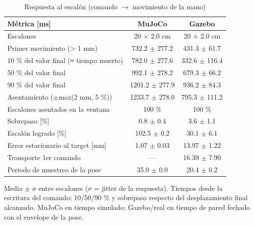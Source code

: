 \begin{table}[htbp]
\centering\small
\caption{Respuesta al escalón (comando $\rightarrow$ movimiento de la mano)}
\begin{tabular}{lcc}
\toprule
Métrica [ms] & MuJoCo & Gazebo \\
\midrule
Escalones & 20 $\times$ 2.0 cm & 20 $\times$ 2.0 cm \\
Primer movimiento (> 1 mm) & 732.2 $\pm$ 277.2 & 431.3 $\pm$ 61.7 \\
10 \% del valor final (≈ tiempo muerto) & 782.0 $\pm$ 277.6 & 332.6 $\pm$ 116.4 \\
50 \% del valor final & 992.1 $\pm$ 278.2 & 679.3 $\pm$ 66.2 \\
90 \% del valor final & 1201.2 $\pm$ 277.9 & 936.2 $\pm$ 84.3 \\
Asentamiento ($\pm$max(2 mm, 5 \%)) & 1233.7 $\pm$ 278.0 & 795.3 $\pm$ 111.2 \\
Escalones asentados en la ventana & 100 \% & 100 \% \\
Sobrepaso [\%] & 0.8 $\pm$ 0.4 & 3.6 $\pm$ 1.1 \\
Escalón logrado [\%] & 102.5 $\pm$ 0.2 & 30.1 $\pm$ 6.1 \\
Error estacionario al target [mm] & 1.07 $\pm$ 0.03 & 13.97 $\pm$ 1.22 \\
Transporte 1er comando & — & 16.39 $\pm$ 7.90 \\
Periodo de muestreo de la pose & 35.0 $\pm$ 0.0 & 20.4 $\pm$ 0.2 \\
\bottomrule
\end{tabular}
\par\footnotesize Media $\pm$ $\sigma$ entre escalones ($\sigma$ = jitter de la respuesta). Tiempos desde la escritura del comando; 10/50/90 \% y sobrepaso respecto del desplazamiento final alcanzado. MuJoCo en tiempo simulado; Gazebo/real en tiempo de pared fechado con el envelope de la pose.
\end{table}

